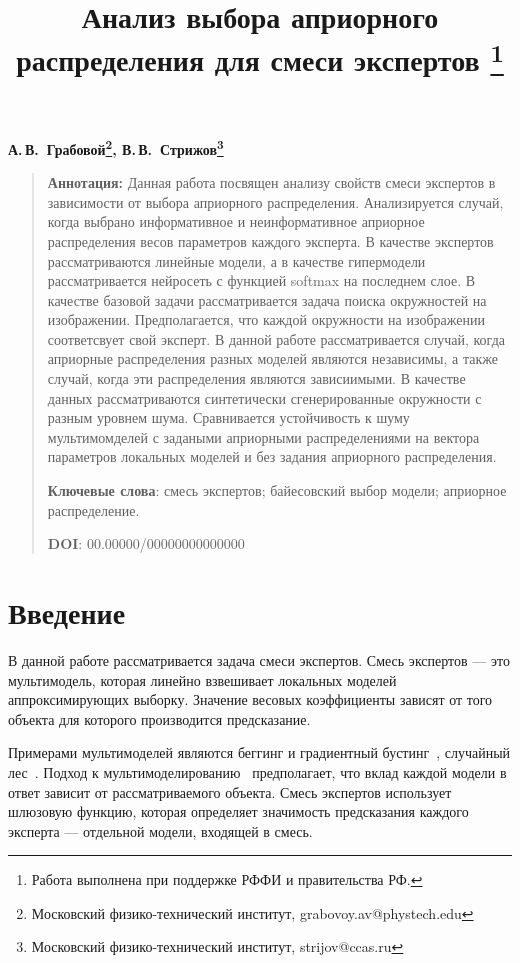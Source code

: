 \documentclass[12pt, twoside]{article}
\numberwithin{equation}{section}
\begin{document}
\title{\bf Анализ выбора априорного распределения для смеси экспертов \thanks{Работа выполнена при поддержке РФФИ и правительства РФ.}}
\date{}
\author{}
\maketitle

\begin{center}
\bf
А.\,В.~Грабовой\footnote{Московский физико-технический институт, grabovoy.av@phystech.edu}, В.\,В.~Стрижов\footnote{Московский физико-технический институт, strijov@ccas.ru}

\end{center}

{\centering\begin{quote}
\textbf{Аннотация:} 
Данная работа посвящен анализу свойств смеси экспертов в зависимости от выбора априорного распределения. Анализируется случай, когда выбрано информативное и неинформативное априорное распределения весов параметров каждого эксперта. В качестве экспертов рассматриваются линейные модели, а в качестве гипермодели рассматривается нейросеть с функцией softmax на последнем слое. В качестве базовой задачи рассматривается задача поиска окружностей на изображении. Предполагается, что каждой окружности на изображении соответсвует свой эксперт. В данной работе рассматривается случай, когда априорные распределения разных моделей являются независимы, а также случай, когда эти распределения являются зависиимыми. В качестве данных рассматриваются синтетически сгенерированные окружности с разным уровнем шума. Сравнивается устойчивость к шуму мультимомделей с задаными априорными распределениями на вектора параметров локальных моделей и без задания априорного распределения.

\smallskip
\textbf{Ключевые слова}: смесь экспертов; байесовский выбор модели; априорное распределение.

\smallskip
\textbf{DOI}: 00.00000/00000000000000
\end{quote}
}

\section{Введение}
В данной работе рассматривается задача смеси экспертов. Смесь экспертов --- это мультимодель, которая линейно взвешивает локальных моделей аппроксимирующих выборку. Значение весовых коэффициенты зависят от того объекта для которого производится предсказание.

Примерами мультимоделей являются беггинг и градиентный бустинг~\cite{Tianqi2016}, случайный лес~\cite{Ishwaran2012}. Подход к мультимоделированию~\cite{Yuksel2012} предполагает, что вклад каждой модели в ответ зависит от рассматриваемого объекта. Смесь экспертов использует шлюзовую функцию, которая определяет значимость предсказания каждого эксперта --- отдельной модели, входящей в смесь.
\end{document}
